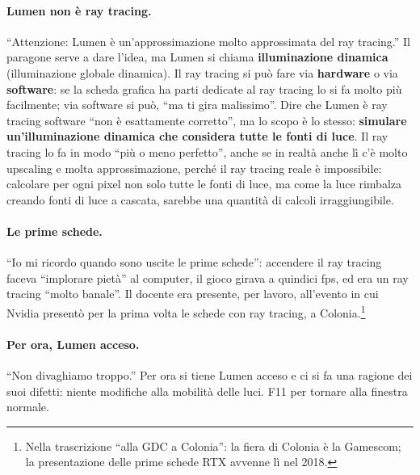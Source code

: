 \paragraph{Lumen non è ray tracing.} ``Attenzione: Lumen è un'approssimazione molto
approssimata del ray tracing.'' Il paragone serve a dare l'idea, ma Lumen si chiama
\textbf{illuminazione dinamica} (illuminazione globale dinamica). Il ray tracing si
può fare via \textbf{hardware} o via \textbf{software}: se la scheda grafica ha parti
dedicate al ray tracing lo si fa molto più facilmente; via software si può, ``ma ti
gira malissimo''. Dire che Lumen è ray tracing software ``non è esattamente
corretto'', ma lo scopo è lo stesso: \textbf{simulare un'illuminazione dinamica che
considera tutte le fonti di luce}. Il ray tracing lo fa in modo ``più o meno
perfetto'', anche se in realtà anche lì c'è molto upscaling e molta
approssimazione, perché il ray tracing reale è impossibile: calcolare per ogni pixel
non solo tutte le fonti di luce, ma come la luce rimbalza creando fonti di luce a
cascata, sarebbe una quantità di calcoli irraggiungibile.

\paragraph{Le prime schede.} ``Io mi ricordo quando sono uscite le prime schede'':
accendere il ray tracing faceva ``implorare pietà'' al computer, il gioco girava a
quindici fps, ed era un ray tracing ``molto banale''. Il docente era presente, per
lavoro, all'evento in cui Nvidia presentò per la prima volta le schede con ray
tracing, a Colonia.\footnote{Nella trascrizione ``alla GDC a Colonia'': la fiera di
Colonia è la Gamescom; la presentazione delle prime schede RTX avvenne lì nel 2018.}

\paragraph{Per ora, Lumen acceso.} ``Non divaghiamo troppo.'' Per ora si tiene Lumen
acceso e ci si fa una ragione dei suoi difetti: niente modifiche alla mobilità delle
luci. F11 per tornare alla finestra normale.

